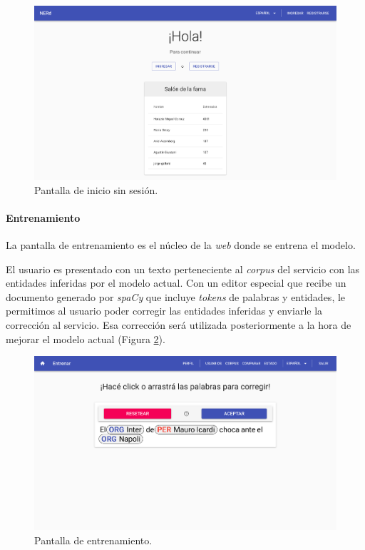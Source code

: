 \documentclass[12pt,a4paper,]{scrartcl}
\let\oldparagraph\paragraph
\renewcommand{\paragraph}[1]{\oldparagraph{#1}\mbox{}}
\begin{document}
\begin{figure}[H]

{\centering \includegraphics{assets/logic/home-anonymous.pdf} 

}

\caption{Pantalla de inicio sin sesión.}\label{fig:logic-home-anonymous}
\end{figure}

\hypertarget{entrenamiento}{%
\paragraph{Entrenamiento}\label{entrenamiento}}

La pantalla de entrenamiento es el núcleo de la \emph{web} donde se entrena el modelo.

El usuario es presentado con un texto perteneciente al \emph{corpus} del servicio con las entidades inferidas por el modelo actual. Con un editor especial que recibe un documento generado por \emph{spaCy} que incluye \emph{tokens} de palabras y entidades, le permitimos al usuario poder corregir las entidades inferidas y enviarle la corrección al servicio. Esa corrección será utilizada posteriormente a la hora de mejorar el modelo actual (Figura \ref{fig:logic-train}).

\begin{figure}[H]

{\centering \includegraphics{assets/logic/train.pdf} 

}

\caption{Pantalla de entrenamiento.}\label{fig:logic-train}
\end{figure}
\end{document}
